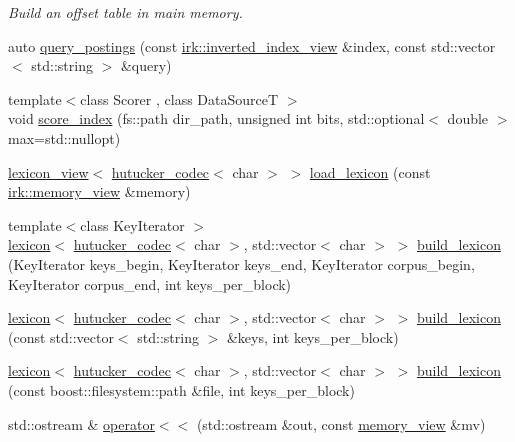 \begin{DoxyCompactItemize}
\begin{DoxyCompactList}\small\item\em Build an offset table in main memory. \end{DoxyCompactList}\item 
auto \mbox{\hyperlink{namespaceirk_af66b19416653b16808a23d66c715635a}{query\+\_\+postings}} (const \mbox{\hyperlink{namespaceirk_a137711df98ba695c3526ba4004853a47}{irk\+::inverted\+\_\+index\+\_\+view}} \&index, const std\+::vector$<$ std\+::string $>$ \&query)
\item 
{\footnotesize template$<$class Scorer , class Data\+SourceT $>$ }\\void \mbox{\hyperlink{namespaceirk_a9bc1b53d67a7c1215efb3e348d00489a}{score\+\_\+index}} (fs\+::path dir\+\_\+path, unsigned int bits, std\+::optional$<$ double $>$ max=std\+::nullopt)
\item 
\mbox{\hyperlink{namespaceirk_ab1814afdb97c1b326d1d549beedf9be8}{lexicon\+\_\+view}}$<$ \mbox{\hyperlink{classirk_1_1hutucker__codec}{hutucker\+\_\+codec}}$<$ char $>$ $>$ \mbox{\hyperlink{namespaceirk_a34aaa6d3890f73c7d082ddbd78340875}{load\+\_\+lexicon}} (const \mbox{\hyperlink{classirk_1_1memory__view}{irk\+::memory\+\_\+view}} \&memory)
\item 
{\footnotesize template$<$class Key\+Iterator $>$ }\\\mbox{\hyperlink{classirk_1_1lexicon}{lexicon}}$<$ \mbox{\hyperlink{classirk_1_1hutucker__codec}{hutucker\+\_\+codec}}$<$ char $>$, std\+::vector$<$ char $>$ $>$ \mbox{\hyperlink{namespaceirk_a7f10e6248e9c76245e3af6a7725869b1}{build\+\_\+lexicon}} (Key\+Iterator keys\+\_\+begin, Key\+Iterator keys\+\_\+end, Key\+Iterator corpus\+\_\+begin, Key\+Iterator corpus\+\_\+end, int keys\+\_\+per\+\_\+block)
\item 
\mbox{\hyperlink{classirk_1_1lexicon}{lexicon}}$<$ \mbox{\hyperlink{classirk_1_1hutucker__codec}{hutucker\+\_\+codec}}$<$ char $>$, std\+::vector$<$ char $>$ $>$ \mbox{\hyperlink{namespaceirk_a01e4a2c7fcbafb8cc06081dd4b668fa2}{build\+\_\+lexicon}} (const std\+::vector$<$ std\+::string $>$ \&keys, int keys\+\_\+per\+\_\+block)
\item 
\mbox{\hyperlink{classirk_1_1lexicon}{lexicon}}$<$ \mbox{\hyperlink{classirk_1_1hutucker__codec}{hutucker\+\_\+codec}}$<$ char $>$, std\+::vector$<$ char $>$ $>$ \mbox{\hyperlink{namespaceirk_a7b84ee82bc35f81ca02abceb807c2372}{build\+\_\+lexicon}} (const boost\+::filesystem\+::path \&file, int keys\+\_\+per\+\_\+block)
\item 
std\+::ostream \& \mbox{\hyperlink{namespaceirk_af318ecad298eb6ae661381e646c04e80}{operator$<$$<$}} (std\+::ostream \&out, const \mbox{\hyperlink{classirk_1_1memory__view}{memory\+\_\+view}} \&mv)

\end{DoxyCompactItemize}
